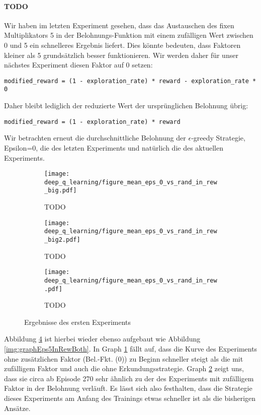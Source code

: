 \paragraph{TODO}
Wir haben im letzten Experiment gesehen, dass das Austauschen des fixen Multiplikators 5 in der Belohnungs-Funktion mit einem zufälligen Wert zwischen 0 und 5 ein schnelleres Ergebnis liefert. Dies könnte bedeuten, dass Faktoren kleiner als 5 grundsätzlich besser funktionieren. Wir werden daher für unser nächstes Experiment diesen Faktor auf 0 setzen:
\begin{verbatim}
modified_reward = (1 - exploration_rate) * reward - exploration_rate * 0
\end{verbatim}
Daher bleibt lediglich der reduzierte Wert der ursprünglichen Belohnung übrig:
\begin{verbatim}
modified_reward = (1 - exploration_rate) * reward
\end{verbatim}
Wir betrachten erneut die durchschnittliche Belohnung der $ \epsilon $-greedy Strategie, Epsilon=0, die des letzten Experiments und natürlich die des aktuellen Experiments.
\begin{figure}[h!]
    \centering
    \begin{subfigure}[b]{0.49\textwidth}
        \texttt{[image: deep\_q\_learning/figure\_mean\_eps\_0\_vs\_rand\_in\_rew\_big.pdf]}
        \caption{TODO}
        \label{img:graphEps0VsRandInRewBig}
    \end{subfigure}
    \begin{subfigure}[b]{0.49\textwidth}
        \texttt{[image: deep\_q\_learning/figure\_mean\_eps\_0\_vs\_rand\_in\_rew\_big2.pdf]}
        \caption{TODO}
        \label{img:graphEps0VsRandInRewBig2}
    \end{subfigure}
    \begin{subfigure}[b]{0.7\textwidth}
        \texttt{[image: deep\_q\_learning/figure\_mean\_eps\_0\_vs\_rand\_in\_rew.pdf]}
        \caption{TODO}
        \label{img:graphEps0VsRandInRew}
    \end{subfigure}
    \caption{Ergebnisse des ersten Experiments}
    \label{img:graphEps0VsRandInRewBoth}
\end{figure}
Abbildung \ref{img:graphEps0VsRandInRewBoth} ist hierbei wieder ebenso aufgebaut wie Abbildung \ref{img:graphEps5InRewBoth}. In Graph \ref{img:graphEps0VsRandInRewBig} fällt auf, dass die Kurve des Experiments ohne zusätzlichen Faktor (Bel.-Fkt. (0)) zu Beginn schneller steigt als die mit zufälligem Faktor und auch die ohne Erkundungsstrategie. Graph \ref{img:graphEps0VsRandInRewBig2} zeigt uns, dass sie circa ab Episode 270 sehr ähnlich zu der des Experiments mit zufälligem Faktor in der Belohnung verläuft. Es lässt sich also festhalten, dass die Strategie dieses Experiments am Anfang des Trainings etwas schneller ist als die bisherigen Ansätze.

